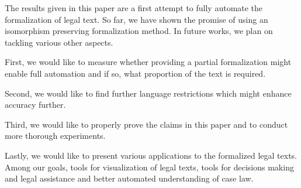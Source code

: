The results given in this paper are a first attempt to fully automate the formalization of legal text. So far, we have shown the promise of using an isomorphism preserving formalization method. In future works, we plan on tackling various other aspects.

First, we would like to measure whether providing a partial formalization might enable full automation and if so, what proportion of the text is required.

Second, we would like to find further language restrictions which might enhance accuracy further.

Third, we would like to properly prove the claims in this paper and to conduct more thorough experiments.

Lastly, we would like to present various applications to the formalized legal texts. Among our goals, tools for visualization of legal texts, tools for decisions making and legal assistance and better automated understanding of case law.